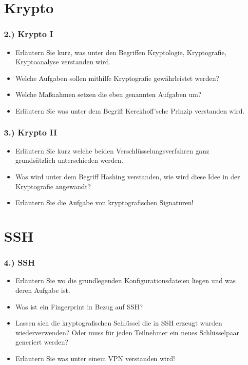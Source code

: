 \documentclass[xcolor=dvipsnames, aspectratio=169]{beamer}
\begin{document}
\section{Krypto}
\begin{frame}
	\frametitle{2.) Krypto I}
	\begin{itemize}
		\item Erläutern Sie kurz, was unter den Begriffen Kryptologie, Kryptografie, Kryptoanalyse verstanden wird.
		\item Welche Aufgaben sollen mithilfe Kryptografie gewährleistet werden?
		\item Welche Maßnahmen setzen die eben genannten Aufgaben um?
		\item Erläutern Sie was unter dem Begriff Kerckhoff'sche Prinzip verstanden wird.
	\end{itemize}
\end{frame}

\begin{frame}
	\frametitle{3.) Krypto II}
	\begin{itemize}
		\item Erläutern Sie kurz welche beiden Verschlüsselungsverfahren ganz grundsätzlich unterschieden werden.
		\item Was wird unter dem Begriff Hashing verstanden, wie wird diese Idee in der Kryptografie angewandt?
		\item Erläutern Sie die Aufgabe von kryptografischen Signaturen!
	\end{itemize}
\end{frame}	
	
\section{SSH}
\begin{frame}
	\frametitle{4.) SSH}
	\begin{itemize}
		\item Erläutern Sie wo die grundlegenden Konfigurationsdateien liegen und was deren Aufgabe ist.
		\item Was ist ein Fingerprint in Bezug auf SSH?
		\item Lassen sich die kryptografischen Schlüssel die in SSH erzeugt wurden wiederverwenden? Oder muss für jeden Teilnehmer ein neues Schlüsselpaar generiert werden?
		\item Erläutern Sie was unter einem VPN verstanden wird!
	\end{itemize}
\end{frame}	
\end{document}
